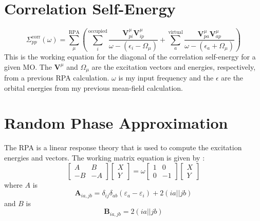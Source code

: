 \documentclass[12pt]{caltech_thesis}
\begin{document}
\section{Correlation Self-Energy}
\begin{equation}
    \Sigma_{pp}^{\text{corr}}(\omega) = \sum_{\mu }^{\text{RPA}}\left(\sum_{i}^{\text{occupied}} \frac{\textbf{V}_{pi}^{\mu }\textbf{V}_{ip}^{\mu }}{\omega -(\epsilon _{i}-\Omega  _{\mu })}+ \sum_{a}^{\text{virtual}} \frac{\textbf{V}_{pa}^{\mu }\textbf{V}_{ap}^{\mu }}{\omega -(\epsilon _{a}+\Omega  _{\mu })}\right)
\end{equation}
This is the working equation for the diagonal of the correlation self-energy for a given MO. The $\textbf{V}^{\mu}$ and $\Omega_{\mu}$ are the excitation vectors and energies, respectively, from a previous RPA calculation. $\omega$ is my input frequency and the $\epsilon$ are the orbital energies from my previous mean-field calculation.



\section{Random Phase Approximation}
The RPA is a linear response theory that is used to compute the excitation energies and vectors. The working matrix equation is given by \autocite{dreuw_single-reference_2005}:
\begin{equation}
\begin{bmatrix}
A & B \\
-B & -A
\end{bmatrix}
\begin{bmatrix}
X \\
Y
\end{bmatrix}
= \omega
\begin{bmatrix}
1 & 0 \\
0 & -1
\end{bmatrix}
\begin{bmatrix}
X \\
Y
\end{bmatrix}
\end{equation}
where $A$ is
\begin{equation}
    \textbf{A}_{ia,jb} = \delta _{ij}\delta _{ab}(\varepsilon _{a}- \varepsilon _{i}) + 2(ia||jb)
\label{eq: A matrix RPA}
\end{equation}
and $B$ is
\begin{equation}
    \textbf{B}_{ia,jb} = 2(ia||jb)
\label{eq: B matrix RPA}
\end{equation}
\end{document}

